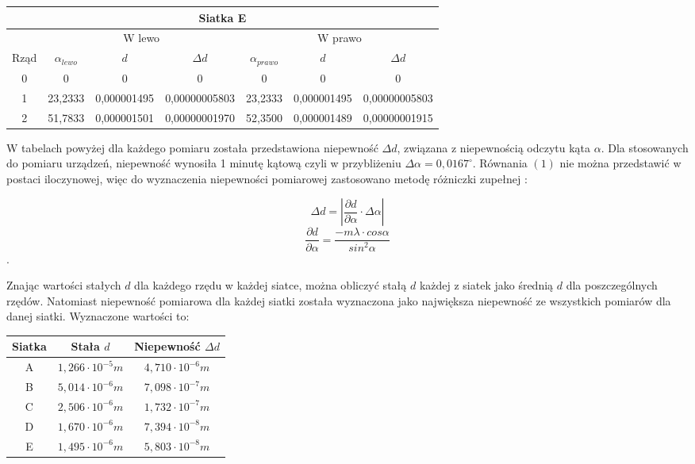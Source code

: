 \documentclass[10pt,a4paper]{article}
\newcommand{\forceindent}{\leavevmode{\parindent=3em\indent}}
\begin{document}
\begin{center}
\begin{tabular}{|c|c|c|c|c|c|c|}
\hline
\multicolumn{7}{|c|}{Siatka E}\\
\hline
& \multicolumn{3}{c}{W lewo} & \multicolumn{3}{|c|}{W prawo}\\
\hline
Rząd & $\alpha_{lewo}$ & $d$ &$\Delta d$ &$\alpha_{prawo}$&$d$&$\Delta d$\\
\hline
0&0&0&0&0&0&0\\ 
\hline
1&23,2333&0,000001495& 0,00000005803 &23,2333& 0,000001495&0,00000005803\\ 
\hline 
2&51,7833&0,000001501& 0,00000001970 &52,3500& 0,000001489&0,00000001915 \\ 
\hline 

\end{tabular}
\end{center}

\newpage

\forceindent W tabelach powyżej dla każdego pomiaru została przedstawiona niepewność $\Delta d$, związana z niepewnością odczytu kąta $\alpha$. Dla stosowanych do pomiaru urządzeń, 
niepewność wynosiła 1 minutę kątową czyli w przybliżeniu $\Delta \alpha = 0,0167^\circ$. Równania $(1)$ nie można przedstawić w postaci iloczynowej, więc do wyznaczenia niepewności pomiarowej zastosowano metodę różniczki zupełnej :

$$
\Delta d = | \frac{\partial d}{\partial \alpha} \cdot \Delta \alpha | 
$$ 
$$
\frac{\partial d}{\partial \alpha} = \frac{-m\lambda \cdot cos\alpha}{sin^2 \alpha}
$$.


\forceindent Znając wartości stałych $d$ dla każdego rzędu w każdej siatce, można obliczyć stałą $d$ każdej z siatek jako średnią $d$ dla poszczególnych rzędów. Natomiast niepewność pomiarowa dla każdej siatki została wyznaczona jako największa niepewność ze wszystkich pomiarów dla danej siatki. Wyznaczone wartości to:
\begin{center}
\begin{tabular}{|c|c|c|}
\hline
Siatka & Stała $d$ & Niepewność $\Delta d$\\
\hline
A & $1,266 \cdot 10^{-5} m$ & $4,710 \cdot 10^{-6} m$\\
\hline
B & $5,014 \cdot 10^{-6} m$ & $7,098 \cdot 10^{-7} m$ \\
\hline
C & $2,506 \cdot 10^{-6} m$ & $1,732 \cdot 10^{-7} m$ \\
\hline
D & $1,670 \cdot 10^{-6} m$ & $7,394 \cdot 10^{-8} m$\\
\hline
E & $1,495 \cdot 10^{-6} m$ & $5,803 \cdot 10^{-8} m$\\
\hline
\end{tabular}
\end{center}
\end{document}
